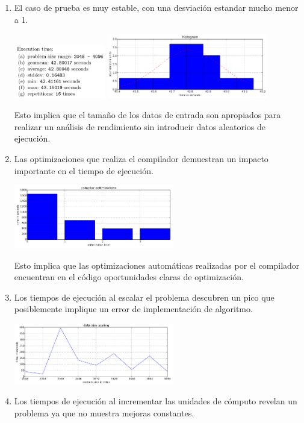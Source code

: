 \documentclass[a4paper]{report}
\begin{document}
\begin{enumerate}

\item El caso de prueba es muy estable, con una desviación estandar mucho menor a 1.

\includegraphics[width=4cm]{mm-01.png}
\includegraphics[width=7cm]{mm-02.png}

Esto implica que el tamaño de los datos de entrada son apropiados para realizar un análisis de rendimiento sin introducir datos aleatorios de ejecución.

\item Las optimizaciones que realiza el compilador demuestran un impacto importante en el tiempo de ejecución.

\includegraphics[width=7cm]{mm-03.png}

Esto implica que las optimizaciones automáticas realizadas por el compilador encuentran en el código oportunidades claras de optimización.

\item Los tiempos de ejecución al escalar el problema descubren un pico que posiblemente implique un error de implementación de algoritmo.

\includegraphics[width=7cm]{mm-04.png}
  
\item Los tiempos de ejecución al incrementar las unidades de cómputo revelan un problema ya que no muestra mejoras constantes.


\end{enumerate}
\end{document}

